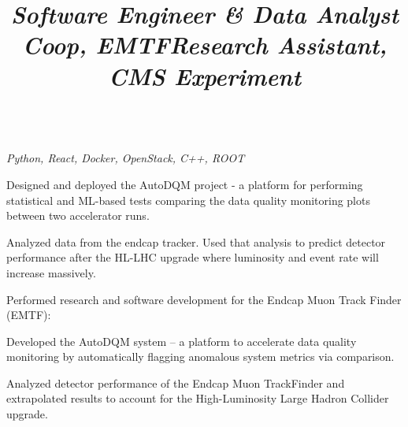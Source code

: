 \documentclass[margin,line,11pt,letterpaper]{res}
\begin{document}
\begin{resume}
    \title{\textit{Software Engineer \& Data Analyst Coop, EMTF}}
    \begin{position}
        \vspace{-3mm}\\
        \emph{Python, React, Docker, OpenStack, C++, ROOT}
        \begin{list2}
            \item Designed and deployed the AutoDQM project - a platform for performing statistical and ML-based tests comparing the data quality monitoring plots between two accelerator runs.
            \item Analyzed data from the endcap tracker. Used that analysis to predict detector performance after the HL-LHC upgrade where luminosity and event rate will increase massively.
        \end{list2}
    \end{position}

    \title{\textit{Research Assistant, CMS Experiment}}
    \begin{position}
        Performed research and software development for the Endcap Muon Track Finder (EMTF):
        \begin{list2}
            \item Developed the AutoDQM system -- a platform to accelerate data quality monitoring by automatically flagging anomalous system metrics via comparison.
            \item Analyzed detector performance of the Endcap Muon TrackFinder and extrapolated results to  account for the High-Luminosity Large Hadron Collider upgrade.
        \end{list2}
    \end{position}
    

\end{resume}
\end{document}
